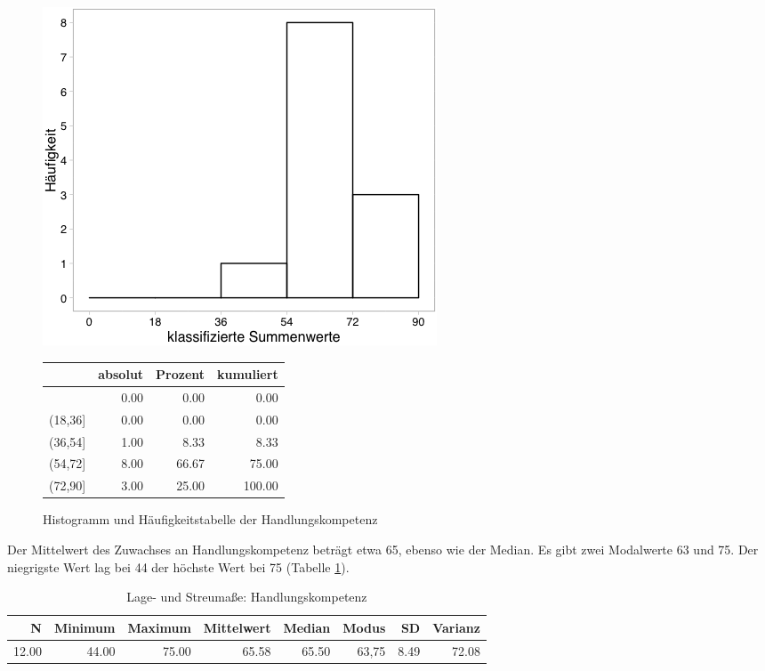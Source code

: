 \documentclass[12pt,smallheadings, bibliography=totoc]{scrartcl}
\begin{document}
\begin{figure}[H]
\begin{minipage}{.4\linewidth}
\includegraphics[width=0.8\linewidth]{Anhang/HKHistnn.png}

\label{pic:aufbau}
\end{minipage}
\begin{minipage}{.4\linewidth}
\centering
\raisebox{\depth}
{\begin{tabular}{rrrr}
  \hline
 & absolut & Prozent & kumuliert \\ 
  \hline
[18] & 0.00 & 0.00 & 0.00 \\ 
  (18,36] & 0.00 & 0.00 & 0.00 \\ 
  (36,54] & 1.00 & 8.33 & 8.33 \\ 
  (54,72] & 8.00 & 66.67 & 75.00 \\ 
  (72,90] & 3.00 & 25.00 & 100.00 \\ 
   \hline
\end{tabular}

}
\label{tab:defis}
\end{minipage}
\caption{Histogramm und Häufigkeitstabelle der Handlungskompetenz}
\label{fig:HK}
\end{figure}

Der Mittelwert des Zuwachses an Handlungskompetenz beträgt etwa 65,
ebenso wie der Median. Es gibt zwei Modalwerte 63 und 75. Der niegrigste
Wert lag bei 44 der höchste Wert bei 75 (Tabelle \ref{lHK}).

\begin{table}[H]
\centering
\caption{Lage- und Streumaße: Handlungskompetenz}
\label{lHK}
\begin{tabular}{rrrrrrrr}
  \hline
  N & Minimum & Maximum & Mittelwert & Median & Modus & SD & Varianz \\
  \hline
12.00 & 44.00 & 75.00 & 65.58 & 65.50 & 63,75 & 8.49 & 72.08 \\
   \hline
\end{tabular}
\end{table}
\end{document}
